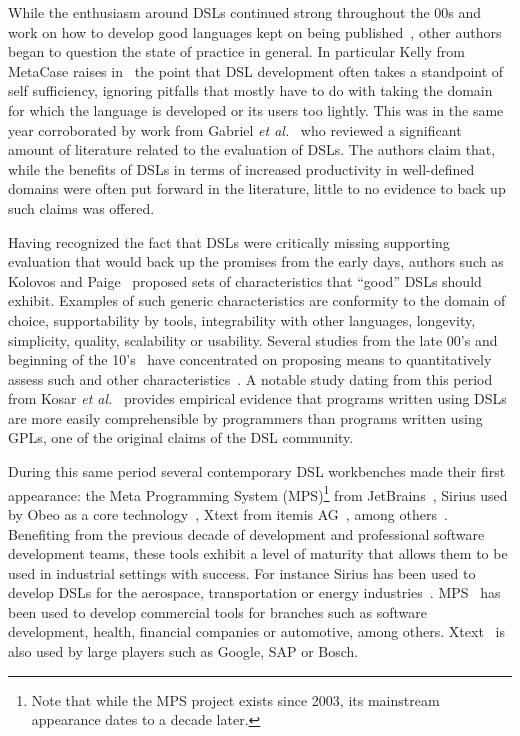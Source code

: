 \documentclass{article}
\begin{document}
While the enthusiasm around DSLs continued strong throughout the 00s and work on
how to develop good languages kept on being published~\cite{Voelter09}, other
authors began to question the state of practice in general. In particular Kelly
from MetaCase raises in~\cite{Kelly2009} the point that DSL development often
takes a standpoint of self sufficiency, ignoring pitfalls that mostly have to do
with taking the domain for which the language is developed or its users too
lightly. This was in the same year corroborated by work from Gabriel \emph{et
al.}~\cite{Gabriel09} who reviewed a significant amount of literature related to
the evaluation of DSLs. The authors claim that, while the benefits of DSLs in
terms of increased productivity in well-defined domains were often put forward
in the literature, little to no evidence to back up such claims was offered.

Having recognized the fact that DSLs were critically missing supporting
evaluation that would back up the promises from the early days, authors such as
Kolovos and Paige~\cite{Kolovos06} proposed sets of characteristics that
``good'' DSLs should exhibit. Examples of such generic characteristics are
conformity to the domain of choice, supportability by tools, integrability with
other languages, longevity, simplicity, quality, scalability or usability.
Several studies from the late 00's and beginning of the 10's~\cite{Kolovos06}
have concentrated on proposing means to quantitatively assess such
and other
characteristics~\cite{KellyTolvanen09,Hermans09,Barisic:12,Kahraman2015}. A
notable study dating from this period from Kosar \emph{et al.}~\cite{Kosar2012}
provides empirical evidence that programs written using DSLs are more easily
comprehensible by programmers than programs written using GPLs, one of the
original claims of the DSL community.

During this same period several contemporary DSL workbenches made their first
appearance: the Meta Programming System (MPS)\footnote{Note that while the MPS
project exists since 2003, its mainstream appearance dates to a decade later.}
from JetBrains~\cite{mps}, Sirius used by Obeo as a core
technology~\cite{sirius}, Xtext from itemis AG~\cite{xtext}, among
others~\cite{Kelly:2013}. Benefiting from the previous decade of development
and professional software development teams, these tools exhibit a level of
maturity that allows them to be used in industrial settings with success. For instance Sirius has been used to develop
DSLs for the aerospace, transportation or energy industries~\cite{obeo}.
MPS~\cite{mps} has been used to develop commercial tools for branches such as
software development, health, financial companies or automotive, among others.
Xtext~\cite{xtext} is also used by large players such as Google, SAP or Bosch.
\end{document}
